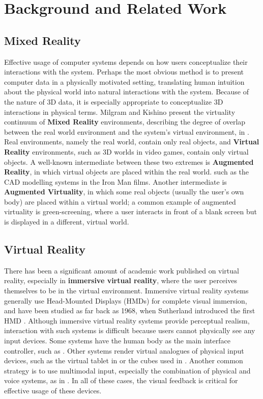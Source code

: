 \documentclass[pageno]{jpaper}
\begin{document}
\section{Background and Related Work}
\subsection{Mixed Reality}
Effective usage of computer systems depends on how users conceptualize their interactions with the system.
Perhaps the most obvious method is to present computer data in a physically motivated setting, translating
human intuition about the physical world into natural interactions with the system. Because of the nature of 3D data,
it is especially appropriate to conceptualize 3D interactions in physical terms. Milgram and Kishino present
the virtuality continuum of {\bf Mixed Reality} environments, describing the degree of overlap between the
real world environment and the system's virtual environment, in \cite{milgram1994taxonomy}. Real environments, namely
the real world, contain only real objects, and {\bf Virtual Reality} environments, such as 3D worlds in video games, contain only
virtual objects. A well-known intermediate between these two extremes is {\bf Augmented Reality}, in which virtual
objects are placed within the real world. such as the CAD modelling systems in the Iron Man films. Another intermediate is
{\bf Augmented Virtuality}, in which some real objects (usually the user's own body) are placed within a virtual world; a common
example of augmented virtuality is green-screening, where a user interacts in front of a blank screen but is displayed in a
different, virtual world.

\subsection{Virtual Reality}
There has been a significant amount of academic work published on virtual reality, especially
in {\bf immersive virtual reality}, where the user perceives themselves to be in the virtual environment. Immersive
virtual reality systems generally use Head-Mounted Displays (HMDs) for complete visual immersion, and have been studied
as far back as 1968, when Sutherland introduced the first HMD \cite{sutherland1968head}. Although immersive virtual reality
systems provide perceptual realism, interaction with such systems is difficult because users cannot physically see any input devices.
Some systems have the human body as the main interface controller, such as \cite{laviola1999whole, laviola1999flex}. Other systems render
virtual analogues of physical input devices, such as the virtual tablet in \cite{poupyrev1998virtual} or the cubes used in \cite{mine1997exploiting}.
Another common strategy is to use multimodal input, especially the combination of physical and voice systems, as in \cite{bolt1980put}.
In all of these cases, the visual feedback is critical for effective usage of these devices.
\end{document}
